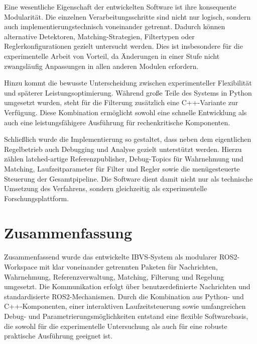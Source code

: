 Eine wesentliche Eigenschaft der entwickelten Software ist ihre konsequente Modularität. Die einzelnen Verarbeitungsschritte sind nicht nur logisch, sondern auch implementierungstechnisch voneinander getrennt. Dadurch können alternative Detektoren, Matching-Strategien, Filtertypen oder Reglerkonfigurationen gezielt untersucht werden. Dies ist insbesondere für die experimentelle Arbeit von Vorteil, da Änderungen in einer Stufe nicht zwangsläufig Anpassungen in allen anderen Modulen erfordern.

Hinzu kommt die bewusste Unterscheidung zwischen experimenteller Flexibilität und späterer Leistungsoptimierung. Während große Teile des Systems in Python umgesetzt wurden, steht für die Filterung zusätzlich eine C++-Variante zur Verfügung. Diese Kombination ermöglicht sowohl eine schnelle Entwicklung als auch eine leistungsfähigere Ausführung für rechenkritische Komponenten.

Schließlich wurde die Implementierung so gestaltet, dass neben dem eigentlichen Regelbetrieb auch Debugging und Analyse gezielt unterstützt werden. Hierzu zählen latched-artige Referenzpublisher, Debug-Topics für Wahrnehmung und Matching, Laufzeitparameter für Filter und Regler sowie die menügesteuerte Steuerung der Gesamtpipeline. Die Software dient damit nicht nur als technische Umsetzung des Verfahrens, sondern gleichzeitig als experimentelle Forschungsplattform.

\section{Zusammenfassung}
\label{sec:zusammenfassung_softwareimplementierung}

Zusammenfassend wurde das entwickelte \ac{IBVS}-System als modularer \ac{ROS2}-Workspace mit klar voneinander getrennten Paketen für Nachrichten, Wahrnehmung, Referenzverwaltung, Matching, Filterung und Regelung umgesetzt. Die Kommunikation erfolgt über benutzerdefinierte Nachrichten und standardisierte \ac{ROS2}-Mechanismen. Durch die Kombination aus Python- und C++-Komponenten, einer interaktiven Laufzeitsteuerung sowie umfangreichen Debug- und Parametrierungsmöglichkeiten entstand eine flexible Softwarebasis, die sowohl für die experimentelle Untersuchung als auch für eine robuste praktische Ausführung geeignet ist.

